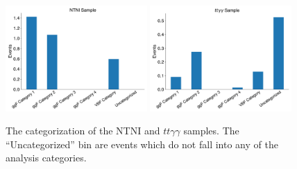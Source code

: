 \begin{figure}
    \centering
    \includegraphics[width=0.48\textwidth]{chapters/chapter6_vbf/images/category_breakdown/ntni_sample.pdf}
    \includegraphics[width=0.48\textwidth]{chapters/chapter6_vbf/images/category_breakdown/ttyy_sample.pdf}
    \caption[The categorization of the \gls{NTNI} and $tt\gamma\gamma$ samples]{The categorization of the \gls{NTNI} and $tt\gamma\gamma$ samples. The ``Uncategorized'' bin are events which do not fall into any of the analysis categories.
    \label{fig:monoH-categorization}}
  \end{figure}